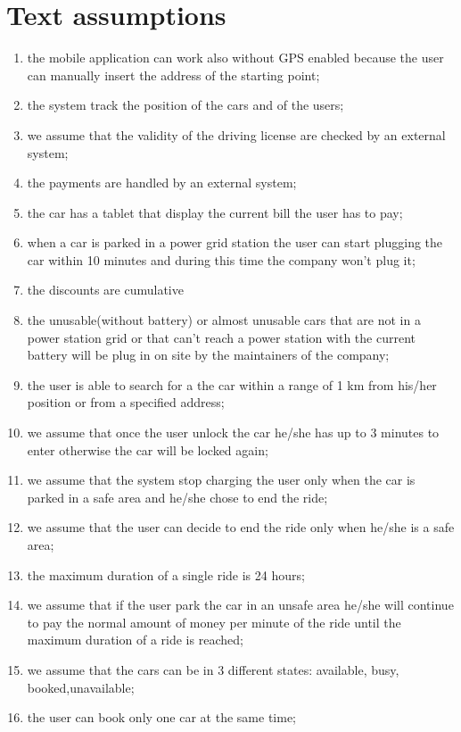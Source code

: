 \section{Text assumptions}
\begin{enumerate}
	\item the mobile application can work also without GPS enabled because the user can manually insert the address of the starting point;
	\item the system track the position of the cars and of the users;
	\item we assume that the validity of the driving license are checked by an external system;
	\item the payments are handled by an external system;
	\item the car has a tablet that display the current bill the user has to pay;
	\item when a car is parked in a power grid station the user can start plugging the car within 10 minutes and during this time the company won't plug it;
	\item the discounts are cumulative
	\item the unusable(without battery) or almost unusable cars that are not in a power station grid or that can't reach a power station with the current battery will be plug in on site by the maintainers of the company;
	\item the user is able to search for a the car within a range of 1 km from his/her position or from a specified address;
	\item we assume that once the user unlock the car he/she has up to 3 minutes to enter otherwise the car will be locked again;
	\item we assume that the system stop charging the user only when the car is parked in a safe area and he/she chose to end the ride;
	\item we assume that the user can decide to end the ride only when he/she is a safe area;
	\item the maximum duration of a single ride is 24 hours;
	\item we assume that if the user park the car in an unsafe area he/she will continue to pay the normal amount of money per minute of the ride until the maximum duration of a ride is reached;
	\item we assume that the cars can be in 3 different states: available, busy, booked,unavailable;
	\item the user can book only one car at the same time;

\end{enumerate}
